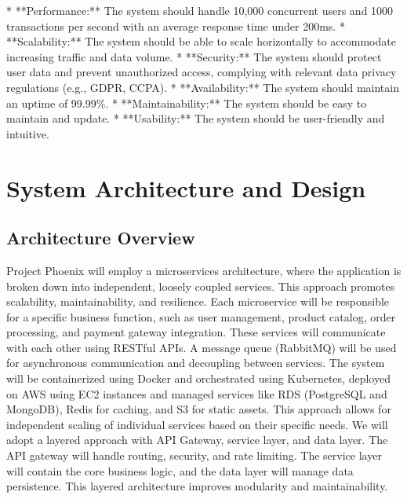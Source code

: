 \documentclass[11pt,a4paper,oneside]{article}
\begin{document}
* **Performance:** The system should handle 10,000 concurrent users and 1000 transactions per second with an average response time under 200ms.
* **Scalability:** The system should be able to scale horizontally to accommodate increasing traffic and data volume.
* **Security:** The system should protect user data and prevent unauthorized access, complying with relevant data privacy regulations (e.g., GDPR, CCPA).
* **Availability:** The system should maintain an uptime of 99.99\%.
* **Maintainability:** The system should be easy to maintain and update.
* **Usability:** The system should be user-friendly and intuitive.

\section{System Architecture and Design}

\subsection{Architecture Overview}

Project Phoenix will employ a microservices architecture, where the application is broken down into independent, loosely coupled services. This approach promotes scalability, maintainability, and resilience. Each microservice will be responsible for a specific business function, such as user management, product catalog, order processing, and payment gateway integration.  These services will communicate with each other using RESTful APIs.  A message queue (RabbitMQ) will be used for asynchronous communication and decoupling between services.  The system will be containerized using Docker and orchestrated using Kubernetes, deployed on AWS using EC2 instances and managed services like RDS (PostgreSQL and MongoDB), Redis for caching, and S3 for static assets.  This approach allows for independent scaling of individual services based on their specific needs.  We will adopt a layered approach with API Gateway, service layer, and data layer.  The API gateway will handle routing, security, and rate limiting.  The service layer will contain the core business logic, and the data layer will manage data persistence.  This layered architecture improves modularity and maintainability.
\end{document}
